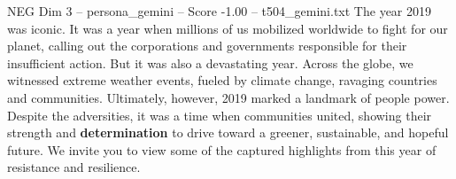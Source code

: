 \begin{textsample}{NEG Dim 3 – persona\_gemini – Score -1.00 – t504\_gemini.txt}  \label{ex:f3_neg_003}
The year 2019 was iconic.
It was a year when millions of us mobilized worldwide to fight for our planet, calling out the corporations and governments responsible for their insufficient action.
But it was also a devastating year.
Across the globe, we witnessed extreme weather events, fueled by climate change, ravaging countries and communities.
Ultimately, however, 2019 marked a landmark of people power.
Despite the adversities, it was a time when communities united, showing their strength and \textbf{determination} to drive toward a greener, sustainable, and hopeful future.
We invite you to view some of the captured highlights from this year of resistance and resilience.

\end{textsample}
